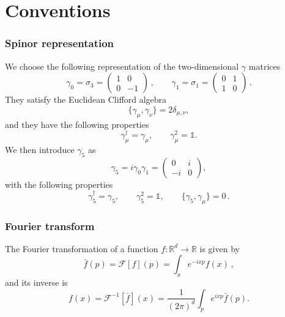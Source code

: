 
\chapter{Conventions} %
\label{chap:AppendixA} %
\subsection*{Spinor representation}
We choose the following representation of the two-dimensional $\gamma$ matrices
\begin{equation*}
        \gamma_0 = \sigma_3 = 
        \begin{pmatrix}
            1 & 0 \\
            0 & -1    
        \end{pmatrix} \, ,
        \qquad 
        \gamma_1 = \sigma_1 = 
        \begin{pmatrix}
            0 & 1 \\
            1 & 0    
        \end{pmatrix} \, .
\end{equation*}
They satisfy the Euclidean Clifford algebra
\begin{equation*}
    \{\gamma_\mu, \gamma_\nu\} = 2\delta_{\mu, \nu},
\end{equation*}
and they have the following properties
\begin{equation*}
    \gamma_\mu^{\dagger}=\gamma_\mu, \quad  \quad \gamma_\mu^2=\mathbb{1}.
\end{equation*}
We then introduce $\gamma_5$ as
\begin{equation*}
    \gamma_5 = i \gamma_0 \gamma_1 =
    \begin{pmatrix}
        0 & i \\
        -i & 0
    \end{pmatrix},
\end{equation*}
with the following properties
\begin{equation*} 
    \gamma_5^{\dagger}=\gamma_5, \qquad \gamma_5^2=\mathbb{1}, \qquad \{\gamma_5, \gamma_\mu\} = 0 \, .
\end{equation*}



\subsection*{Fourier transform}
The Fourier transformation of a function $f: \mathbb{R}^d \rightarrow \mathbb{R}$ is given by
\begin{equation*}
\bar{f}(p)=\mathcal{F}[f](p)=\int_x e^{-ixp} f(x) \, ,
\end{equation*}
and its inverse is
\begin{equation*}
f(x)=\mathcal{F}^{-1}[\bar{f}](x)=\frac{1}{(2 \pi)^d} \int_p e^{ixp} \bar{f}(p).
\end{equation*}

